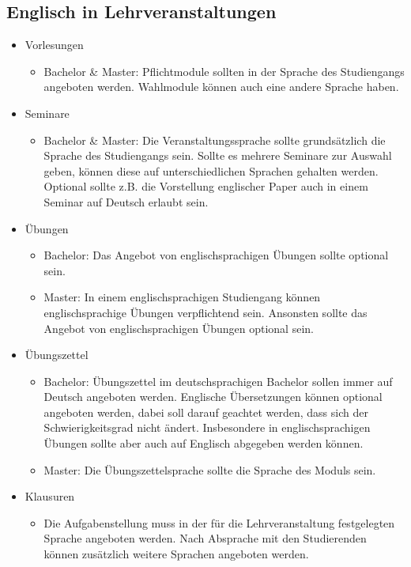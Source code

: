 \documentclass[DIV=calc]{scrartcl}
\begin{document}
\subsection*{Englisch in Lehrveranstaltungen}
\begin{itemize}
    \item Vorlesungen
    \begin{itemize}
        \item Bachelor \& Master: Pflichtmodule sollten in der Sprache des Studiengangs angeboten werden. Wahlmodule können auch eine andere Sprache haben.
    \end{itemize}
    \item Seminare
    \begin{itemize}
        \item Bachelor \& Master: Die Veranstaltungssprache sollte grundsätzlich die Sprache des Studiengangs sein. Sollte es mehrere Seminare zur Auswahl geben, können diese auf unterschiedlichen Sprachen gehalten werden. Optional sollte z.B. die Vorstellung englischer Paper auch in einem Seminar auf Deutsch erlaubt sein.
    \end{itemize}
    \item Übungen
    \begin{itemize}
        \item Bachelor: Das Angebot von englischsprachigen Übungen sollte optional sein.
        \item Master: In einem englischsprachigen Studiengang können englischsprachige Übungen verpflichtend sein. Ansonsten sollte das Angebot von englischsprachigen Übungen optional sein.
    \end{itemize}
    \item Übungszettel
    \begin{itemize}
        \item Bachelor: Übungszettel im deutschsprachigen Bachelor sollen immer auf Deutsch angeboten werden. Englische Übersetzungen können optional angeboten werden, dabei soll darauf geachtet werden, dass sich der Schwierigkeitsgrad nicht ändert. Insbesondere in englischsprachigen Übungen sollte aber auch auf Englisch abgegeben werden können.
        \item Master: Die Übungszettelsprache sollte die Sprache des Moduls sein.
    \end{itemize}
    \item Klausuren
    \begin{itemize}
        \item Die Aufgabenstellung muss in der für die Lehrveranstaltung festgelegten Sprache angeboten werden. Nach Absprache mit den Studierenden können zusätzlich weitere Sprachen angeboten werden.

\end{itemize}
\end{itemize}
\end{document}
